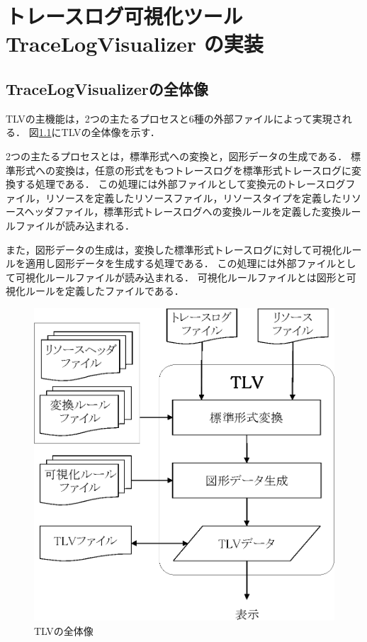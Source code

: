 \chapter{トレースログ可視化ツール TraceLogVisualizer の実装}

\section{TraceLogVisualizerの全体像}

TLVの主機能は，2つの主たるプロセスと6種の外部ファイルによって実現される．
図\ref{fig:tlv}にTLVの全体像を示す．

2つの主たるプロセスとは，標準形式への変換と，図形データの生成である．
標準形式への変換は，任意の形式をもつトレースログを標準形式トレースログに変換する処理である．
この処理には外部ファイルとして変換元のトレースログファイル，リソースを定義したリソースファイル，リソースタイプを定義したリソースヘッダファイル，標準形式トレースログへの変換ルールを定義した変換ルールファイルが読み込まれる．

また，図形データの生成は，変換した標準形式トレースログに対して可視化ルールを適用し図形データを生成する処理である．
この処理には外部ファイルとして可視化ルールファイルが読み込まれる．
可視化ルールファイルとは図形と可視化ルールを定義したファイルである．

\begin{figure}[p]
\begin{center}
\includegraphics[scale=0.75]{img/tlv.eps}
\caption{TLVの全体像}
\label{fig:tlv}
\end{center}
\end{figure}

